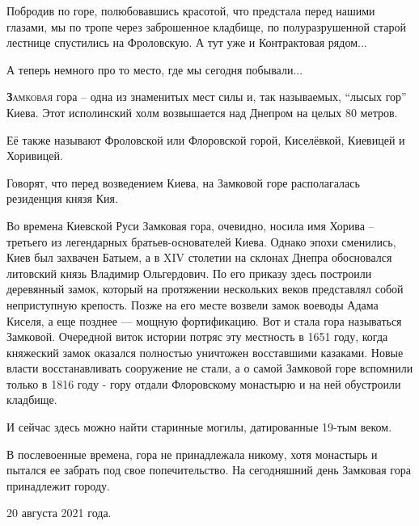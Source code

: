
Побродив по горе, полюбовавшись красотой, что предстала перед нашими глазами, мы
по тропе через заброшенное кладбище, по полуразрушенной старой лестнице
спустились на Фроловскую. А тут уже и Контрактовая рядом...


А теперь немного про то место, где мы сегодня побывали...

\lettrine[lraise=0.1, nindent=0em, slope=-.5em, lines=2]{\textbf{З}}{амковая}
гора – одна из знаменитых мест силы и, так называемых, \enquote{лысых гор}
Киева. Этот исполинский холм возвышается над Днепром на целых 80 метров.

Её также называют Фроловской или Флоровской горой, Киселёвкой, Киевицей и
Хоривицей.

Говорят, что перед возведением Киева, на Замковой горе располагалась резиденция
князя Кия. 

Во времена Киевской Руси Замковая гора, очевидно, носила имя Хорива – третьего
из легендарных братьев-основателей Киева. Однако эпохи сменились, Киев был
захвачен Батыем, а в XIV столетии на склонах Днепра обосновался литовский князь
Владимир Ольгердович. По его приказу здесь построили деревянный замок, который
на протяжении нескольких веков представлял собой неприступную крепость. Позже
на его месте возвели замок воеводы Адама Киселя, а еще позднее — мощную
фортификацию. Вот и стала гора называться Замковой. Очередной виток истории
потряс эту местность в 1651 году, когда княжеский замок оказался полностью
уничтожен восставшими казаками. Новые власти восстанавливать сооружение не
стали, а о самой Замковой горе вспомнили только в 1816 году  - гору отдали
Флоровскому монастырю и на ней обустроили кладбище.

И сейчас здесь можно найти старинные могилы, датированные 19-тым веком.

В послевоенные времена, гора не принадлежала никому, хотя монастырь и пытался
ее забрать под свое попечительство. На сегодняшний день Замковая гора
принадлежит городу.

20 августа 2021 года.

\begin{multicols}{2} %
\setlength{\parindent}{0pt}




\end{multicols} %


